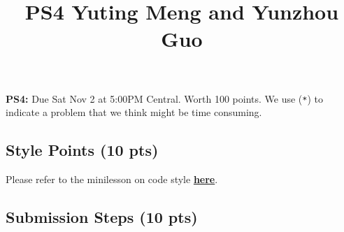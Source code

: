 \documentclass[
  letterpaper,
  DIV=11,
  numbers=noendperiod]{scrartcl}
\title{PS4 Yuting Meng and Yunzhou Guo}
\author{}
\date{}
\begin{document}
\maketitle



\textbf{PS4:} Due Sat Nov 2 at 5:00PM Central. Worth 100 points. We use
(\texttt{*}) to indicate a problem that we think might be time
consuming.

\subsection{Style Points (10 pts)}\label{style-points-10-pts}

Please refer to the minilesson on code style
\textbf{\href{https://uchicago.zoom.us/rec/share/pG_wQ-pHTQrJTmqNn4rcrw5V194M2H2s-2jdy8oVhWHkd_yZt9o162IWurpA-fxU.BIQlSgZLRYctvzp-}{here}}.

\subsection{Submission Steps (10 pts)}\label{submission-steps-10-pts}
\end{document}
